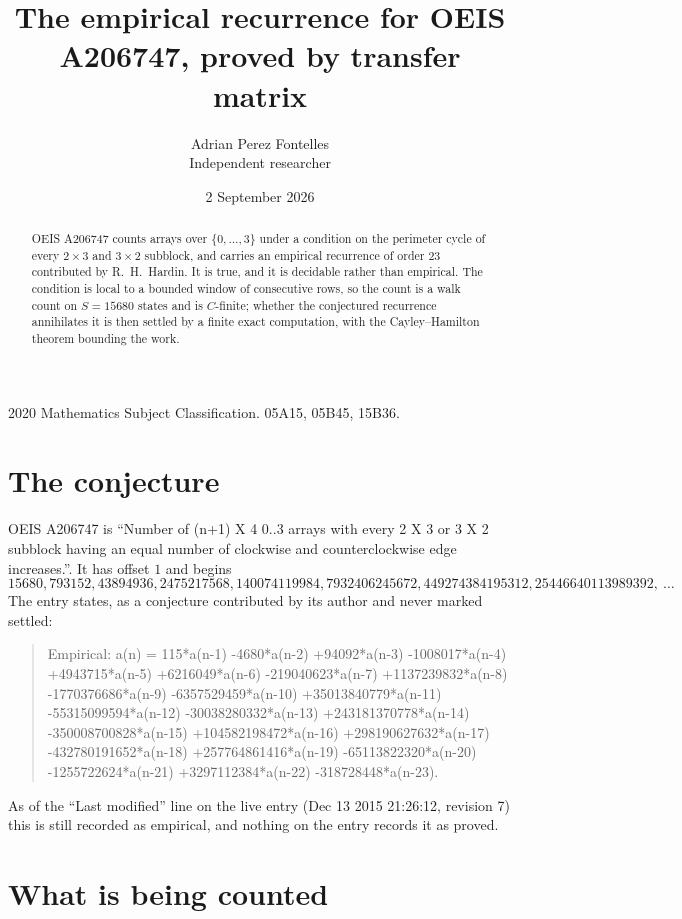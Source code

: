 \documentclass[11pt,a4paper]{article}
\title{The empirical recurrence for OEIS A206747, proved by transfer matrix}
\author{Adrian Perez Fontelles\\ \small Independent researcher}
\date{2 September 2026}
\theoremstyle{plain}
\theoremstyle{definition}
\begin{document}
\maketitle

\begin{abstract}
OEIS A206747 counts arrays over $\{0,\dots,3\}$ under a condition on the perimeter cycle of
every $2\times3$ and $3\times2$ subblock, and carries an empirical recurrence of order $23$ contributed by
R.~H.~Hardin. It is true, and it is decidable rather than empirical. The condition is local to
a bounded window of consecutive rows, so the count is a walk count on $S=15680$ states and is
$C$-finite; whether the conjectured recurrence annihilates it is then settled by a finite exact
computation, with the Cayley--Hamilton theorem bounding the work.
\end{abstract}

\noindent\small 2020 Mathematics Subject Classification. 05A15, 05B45, 15B36.\normalsize

\section{The conjecture}

OEIS A206747 is ``Number of (n+1) X 4 0..3 arrays with every 2 X 3 or 3 X 2 subblock having an equal number of clockwise and counterclockwise edge increases.''. It has offset $1$ and begins
\[
15680, 793152, 43894936, 2475217568, 140074119984, 7932406245672, 449274384195312, 25446640113989392,\ \dots
\]
The entry states, as a conjecture contributed by its author and never marked settled:
\begin{quote}
Empirical: a(n) = 115*a(n-1) -4680*a(n-2) +94092*a(n-3) -1008017*a(n-4) +4943715*a(n-5) +6216049*a(n-6) -219040623*a(n-7) +1137239832*a(n-8) -1770376686*a(n-9) -6357529459*a(n-10) +35013840779*a(n-11) -55315099594*a(n-12) -30038280332*a(n-13) +243181370778*a(n-14) -350008700828*a(n-15) +104582198472*a(n-16) +298190627632*a(n-17) -432780191652*a(n-18) +257764861416*a(n-19) -65113822320*a(n-20) -1255722624*a(n-21) +3297112384*a(n-22) -318728448*a(n-23).
\end{quote}
As of the ``Last modified'' line on the live entry (Dec 13 2015 21:26:12, revision 7) this is still
recorded as empirical, and nothing on the entry records it as proved.

\section{What is being counted}
\end{document}
